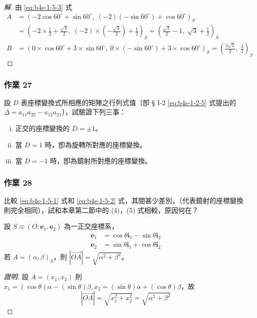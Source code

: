 \begin{proof}[解]
由 \eqref{eq:b4s-1-5-3} 式
\begin{align*}
A &= \left(-2\cos 60^\circ + \sin 60^\circ, \; (-2)(-\sin 60^\circ) + \cos 60^\circ\right)_S \\
&= \left(-2 \times \frac{1}{2} + \frac{\sqrt{3}}{2}, \; (-2) \times \left(-\frac{\sqrt{3}}{2}\right) + \frac{1}{2}\right)_S = \left(\frac{\sqrt{3}}{2} - 1, \; \sqrt{3} + \frac{1}{2}\right)_S \\
B &= \left(0 \times \cos 60^\circ + 3 \times \sin 60^\circ, \; 0 \times (-\sin 60^\circ) + 3 \times \cos 60^\circ\right)_S = \left(\frac{3\sqrt{3}}{2}, \; \frac{3}{2}\right)_S
\end{align*}
\end{proof}

\subsubsection*{作業 27}
設 $D$ 表座標變換式所相應的矩陣之行列式值〔卽 § I-2 \eqref{eq:b4s-1-2-5} 式提出的 $\Delta = a_{11}a_{22} - a_{12}a_{21}$〕，試驗證下列三事：
\begin{enumerate}[(i)]
  \item 正交的座標變換的 $D = \pm 1$。
  \item 當 $D = 1$ 時，卽為旋轉所對應的座標變換。
  \item 當 $D = -1$ 時，卽為鏡射所對應的座標變換。
\end{enumerate}

\subsubsection*{作業 28}
比較 \eqref{eq:b4s-1-5-1} 式和 \eqref{eq:b4s-1-5-2} 式，其間甚少差別，（代表鏡射的座標變換則完全相同），試和本章第二節中的 (4)，(5) 式相較，原因何在？

\begin{example}[例 11]
設 $S \equiv (O; \mathbf{e}_1, \mathbf{e}_2)$ 為一正交座標系，
\begin{align*}
\mathbf{e}_1 &= \cos\theta\mathbf{i}_1 - \sin\theta\mathbf{i}_2 \\
\mathbf{e}_2 &= \sin\theta\mathbf{i}_1 + \cos\theta\mathbf{i}_2
\end{align*}
若 $A = (\alpha, \beta)_S$，則 $|\vec{OA}| = \sqrt{\alpha^2 + \beta^2}$。
\end{example}

\begin{proof}[證明]
設 $A = (x_1, x_2)$ 則 $x_1 = (\cos\theta)\alpha - (\sin\theta)\beta, x_2 = (\sin\theta)\alpha + (\cos\theta)\beta$，故
\[ |\vec{OA}| = \sqrt{x_1^2 + x_2^2} = \sqrt{\alpha^2 + \beta^2} \]
\end{proof}

